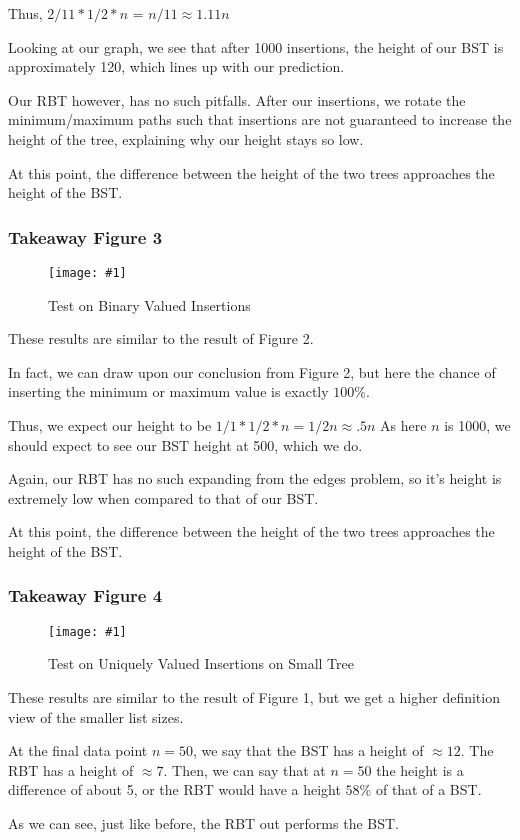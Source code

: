 \documentclass{article}
\newcommand{\figureInsetScaled}[3]
{
    \FloatBarrier{}
    \figureRaw{#1}{#2}{#3}
    \FloatBarrier{}
}
\newcommand{\figureRaw}[3]
{
    \begin{figure}[ht!]
        \centering
        \texttt{[image: \#1]}
        \caption{#2}
    \end{figure}
}
\begin{document}
Thus, $2/11 * 1/2 * n$ = $n/11 \approx 1.11n$ 

Looking at our graph, we see that after 1000 insertions, the height of our BST is approximately 120, which lines up with our prediction.

Our RBT however, has no such pitfalls. After our insertions, we rotate the minimum/maximum paths such that insertions are not guaranteed to increase the height of the tree, explaining why our height stays so low.

At this point, the difference between the height of the two trees approaches the height of the BST.

\subsubsection{Takeaway Figure 3}
\figureInsetScaled{images/experiment1/Figure_3.png}{Test on Binary Valued Insertions}{0.5}

These results are similar to the result of Figure 2.

In fact, we can draw upon our conclusion from Figure 2, but here the chance of inserting the minimum or maximum value is exactly $100\%$.

Thus, we expect our height to be $1/1 * 1/2 * n = 1/2n \approx .5n$ As here $n$ is 1000, we should expect to see our BST height at 500, which we do.

Again, our RBT has no such expanding from the edges problem, so it's height is extremely low when compared to that of our BST.

At this point, the difference between the height of the two trees approaches the height of the BST.

\subsubsection{Takeaway Figure 4}
\figureInsetScaled{images/experiment1/Figure_4.png}{Test on Uniquely Valued Insertions on Small Tree}{0.5}

These results are similar to the result of Figure 1, but we get a higher definition view of the smaller list sizes.

At the final data point $n=50$, we say that the BST has a height of $\approx12$. The RBT has a height of $\approx 7$. Then, we can say that at $n=50$ the height is a difference of about 5, or the RBT would have a height $58\%$ of that of a BST.

As we can see, just like before, the RBT out performs the BST.
\end{document}
